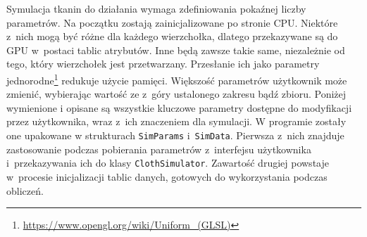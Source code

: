 			Symulacja tkanin do działania wymaga zdefiniowania pokaźnej liczby parametrów. Na początku zostają zainicjalizowane po stronie CPU. Niektóre z~nich mogą być różne dla każdego wierzchołka, dlatego przekazywane są do GPU w~postaci tablic atrybutów. Inne będą zawsze takie same, niezależnie od tego, który wierzchołek jest przetwarzany. Przesłanie ich jako parametry jednorodne\footnote{\href{https://www.opengl.org/wiki/Uniform\_(GLSL)}{https://www.opengl.org/wiki/Uniform\_(GLSL)}} redukuje użycie pamięci. Większość parametrów użytkownik może zmienić, wybierając wartość ze z~góry ustalonego zakresu bądź zbioru. Poniżej wymienione i opisane są wszystkie kluczowe parametry dostępne do modyfikacji przez użytkownika, wraz z~ich znaczeniem dla symulacji. W programie zostały one upakowane w strukturach \texttt{SimParams} i~\texttt{SimData}. Pierwsza z~nich znajduje zastosowanie podczas pobierania parametrów z~interfejsu użytkownika i~przekazywania ich do klasy \texttt{ClothSimulator}. Zawartość drugiej powstaje w~procesie inicjalizacji tablic danych, gotowych do wykorzystania podczas obliczeń.
			
